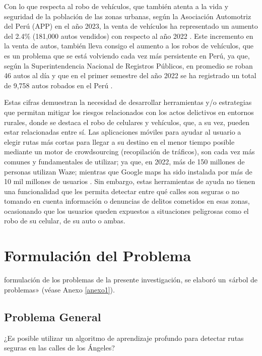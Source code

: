 Con lo que respecta al robo de vehículos, que también atenta a la vida y seguridad de la población de las zonas urbanas, según la Asociación Automotriz del Perú (APP) en el año 2023, la venta de vehículos ha representado un aumento del 2.4\% (181,000 autos vendidos) con respecto al año 2022 \parencite{cu_amcha}. Este incremento en la venta de autos, también lleva consigo el aumento a los robos de vehículos, que es un problema que se está volviendo cada vez más persistente en Perú, ya que, según la Superintendencia Nacional de Registros Públicos, en promedio se roban 46 autos al día y que en el primer semestre del año 2022 se ha registrado un total de 9,758 autos robados en el Perú \parencite{cu_track}. 

Estas cifras demuestran la necesidad de desarrollar herramientas y/o estrategias que permitan mitigar los riesgos relacionados con los actos delictivos en entornos rurales, donde se destaca el robo de celulares y vehículos, que, a su vez, pueden estar relacionadas entre sí. Las aplicaciones móviles para ayudar al usuario a elegir rutas más cortas para llegar a su destino en el menor tiempo posible mediante un motor de crowdsourcing (recopilación de tráficos), son cada vez más comunes y fundamentales de utilizar; ya que, en 2022, más de 150 millones de personas utilizan Waze; mientras que Google maps ha sido instalada por más de 10 mil millones de usuarios \parencite{cu_luishernan}. Sin embargo, estas herramientas de ayuda no tienen una funcionalidad que les permita detectar entre qué calles son seguras o no tomando en cuenta información o denuncias de delitos cometidos en esas zonas, ocasionando que los usuarios queden expuestos a situaciones peligrosas como el robo de su celular, de su auto o ambas. 



\section{Formulación del Problema}

 formulación de los problemas de la presente investigación, se elaboró un «árbol de problemas» (véase Anexo \ref{anexo1}). 

\subsection{Problema General}
\newcommand{\ProblemaGeneral}{
	¿Es posible utilizar un algoritmo de aprendizaje profundo para detectar rutas seguras en las calles de los Ángeles? 
}
\ProblemaGeneral
